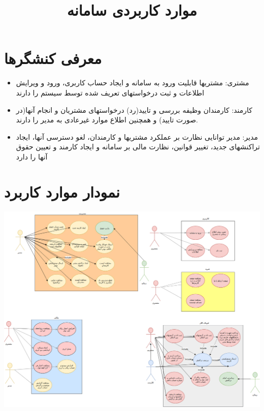 \documentclass{article}
\title{موارد کاربردی سامانه}
\begin{document}
\maketitle
\section{معرفی کنشگرها}
\begin{itemize}
\item مشتری: مشتریها قابلیت ورود به سامانه و ایجاد حساب کاربری، ورود و ویرایش اطلاعات و ثبت درخواستهای تعریف شده توسط سیستم را دارند
\item کارمند: کارمندان وظیفه بررسی و تایید(رد) درخواستهای مشتریان و انجام آنها(در صورت تایید) و همچنین اطلاع موارد غیرعادی به مدیر را دارند.
\item مدیر: مدیر توانایی نظارت بر عملکرد مشتریها و کارمندان، لغو دسترسی آنها، ایجاد تراکنشهای جدید، تغییر قوانین، نظارت مالی بر سامانه و ایجاد کارمند و تعیین حقوق آنها را دارد
\end{itemize}
\section{نمودار موارد کاربرد}
\includegraphics[width=17cm]{./Diagrams/all.png}
\newpage
\end{document}
